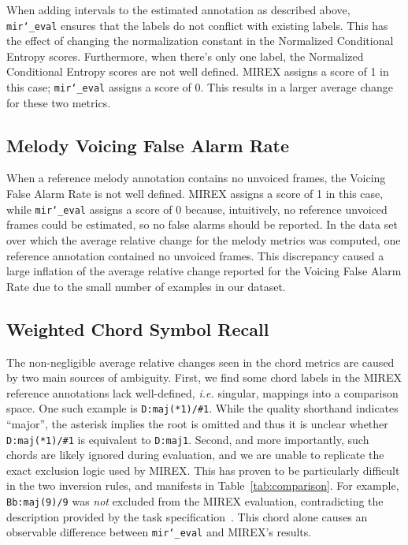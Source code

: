 \documentclass{article}
\def\ie{\emph{i.e.}}
\def\mireval{\texttt{mir\char`_eval}}
\begin{document}
When adding intervals to the estimated annotation as described above, \mireval{} ensures that the labels do not conflict with existing labels.
This has the effect of changing the normalization constant in the Normalized Conditional Entropy scores.
Furthermore, when there's only one label, the Normalized Conditional Entropy scores are not well defined.
MIREX assigns a score of 1 in this case; \mireval{} assigns a score of 0.
This results in a larger average change for these two metrics.

\subsection{Melody Voicing False Alarm Rate}

When a reference melody annotation contains no unvoiced frames, the Voicing False Alarm Rate is not well defined.
MIREX assigns a score of 1 in this case, while \mireval{} assigns a score of 0 because, intuitively, no reference unvoiced frames could be estimated, so no false alarms should be reported.
In the data set over which the average relative change for the melody metrics was computed, one reference annotation contained no unvoiced frames.
This discrepancy caused a large inflation of the average relative change reported for the Voicing False Alarm Rate due to the small number of examples in our dataset.

\subsection{Weighted Chord Symbol Recall}
The non-negligible average relative changes seen in the chord metrics are caused by two main sources of ambiguity.
First, we find some chord labels in the MIREX reference annotations lack well-defined, \ie{} singular, mappings into a comparison space. 
One such example is \texttt{D:maj(*1)/\#1}.
While the quality shorthand indicates ``major'', the asterisk implies the root is omitted and thus it is unclear whether \texttt{D:maj(*1)/\#1} is equivalent to \texttt{D:maj1}.
Second, and more importantly, such chords are likely ignored during evaluation, and we are unable to replicate the exact exclusion logic used by MIREX.
This has proven to be particularly difficult in the two inversion rules, and manifests
in Table~\ref{tab:comparison}. 
For example, \texttt{Bb:maj(9)/9} was \emph{not} excluded from the MIREX evaluation,
contradicting the description provided by the task specification~\cite{choi2013mirex}.
This chord alone causes an observable difference between \mireval{} and MIREX's results.
\end{document}
